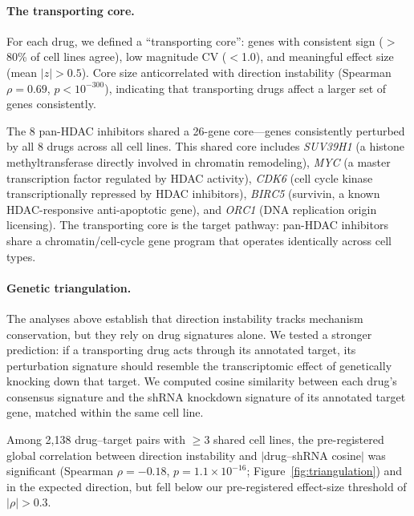 \documentclass{article}
\begin{document}
\paragraph{The transporting core.}

For each drug, we defined a ``transporting core'': genes with consistent
sign ($>$80\% of cell lines agree), low magnitude CV ($<$1.0), and
meaningful effect size (mean $|z| > 0.5$). Core size anticorrelated with
direction instability (Spearman $\rho = 0.69$, $p < 10^{-300}$),
indicating that transporting drugs affect a larger set of genes
consistently.

The 8 pan-HDAC inhibitors shared a 26-gene core---genes consistently
perturbed by all 8 drugs across all cell lines. This shared core
includes \emph{SUV39H1} (a histone methyltransferase directly involved
in chromatin remodeling), \emph{MYC} (a master transcription factor
regulated by HDAC activity), \emph{CDK6} (cell cycle kinase
transcriptionally repressed by HDAC inhibitors), \emph{BIRC5}
(survivin, a known HDAC-responsive anti-apoptotic gene), and \emph{ORC1}
(DNA replication origin licensing). The transporting core is the target
pathway: pan-HDAC inhibitors share a chromatin/cell-cycle gene program
that operates identically across cell types.

\paragraph{Genetic triangulation.}

The analyses above establish that direction instability tracks
mechanism conservation, but they rely on drug signatures alone. We tested
a stronger prediction: if a transporting drug acts through its
annotated target, its perturbation signature should resemble the
transcriptomic effect of genetically knocking down that target. We computed
cosine similarity between each drug's consensus signature and the shRNA
knockdown signature of its annotated target gene, matched within the same
cell line.

Among 2{,}138 drug--target pairs with $\geq3$ shared cell lines, the
pre-registered global correlation between direction instability and
$|$drug--shRNA cosine$|$ was significant (Spearman $\rho = -0.18$,
$p = 1.1 \times 10^{-16}$; Figure~\ref{fig:triangulation}) and in the
expected direction, but fell below our pre-registered effect-size
threshold of $|\rho| > 0.3$.
\end{document}
